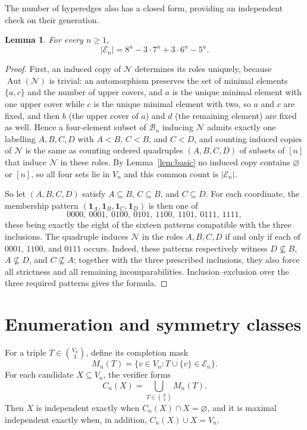 \documentclass[11pt]{amsart}
\newtheorem{lemma}[theorem]{Lemma}
\newcommand{\Bn}{\mathcal B_n}
\newcommand{\Nposet}{\mathcal N}
\begin{document}
The number of hyperedges also has a closed form, providing an independent
check on their generation.

\begin{lemma}\label{lem:edgecount}
For every $n\geq 1$,
\[
|\mathcal E_n|=8^n-3\cdot 7^n+3\cdot 6^n-5^n.
\]
\end{lemma}

\begin{proof}
First, an induced copy of $\Nposet$ determines its roles uniquely, because
$\operatorname{Aut}(\Nposet)$ is trivial: an automorphism preserves the set of
minimal elements $\{a,c\}$ and the number of upper covers, and $a$ is the
unique minimal element with one upper cover while $c$ is the unique minimal
element with two, so $a$ and $c$ are fixed, and then $b$ (the upper cover of
$a$) and $d$ (the remaining element) are fixed as well. Hence a four-element
subset of $\Bn$ inducing $\Nposet$ admits exactly one labelling $A,B,C,D$ with
$A<B$, $C<B$, and $C<D$, and counting induced copies of $\Nposet$ is the same
as counting ordered quadruples $(A,B,C,D)$ of subsets of $[n]$ that induce
$\Nposet$ in these roles. By Lemma~\ref{lem:basic} no induced copy contains
$\varnothing$ or $[n]$, so all four sets lie in $V_n$ and this common count is
$|\mathcal E_n|$.

So let $(A,B,C,D)$ satisfy $A\subseteq B$, $C\subseteq B$, and $C\subseteq D$.
For each coordinate, the membership pattern
$(\mathbf 1_A,\mathbf 1_B,\mathbf 1_C,\mathbf 1_D)$ is then one of
\[
0000,\ 0001,\ 0100,\ 0101,\ 1100,\ 1101,\ 0111,\ 1111,
\]
these being exactly the eight of the sixteen patterns compatible with the three
inclusions. The quadruple induces $\Nposet$ in the roles $A,B,C,D$ if and only
if each of $0001$, $1100$, and $0111$ occurs.
Indeed, these patterns respectively witness $D\nsubseteq B$,
$A\nsubseteq D$, and $C\nsubseteq A$; together with the three prescribed
inclusions, they also force all strictness and all remaining
incomparabilities. Inclusion--exclusion over the three required patterns gives
the formula.
\end{proof}

\section{Enumeration and symmetry classes}

For a triple $T\in\binom{V_n}{3}$, define its completion mask
\[
M_n(T)=\{v\in V_n:T\cup\{v\}\in\mathcal E_n\}.
\]
For each candidate $X\subseteq V_n$, the verifier forms
\[
C_n(X)=\bigcup_{T\in\binom{X}{3}}M_n(T).
\]
Then $X$ is independent exactly when $C_n(X)\cap X=\varnothing$, and it is
maximal independent exactly when, in addition,
$C_n(X)\cup X=V_n$.
\end{document}
